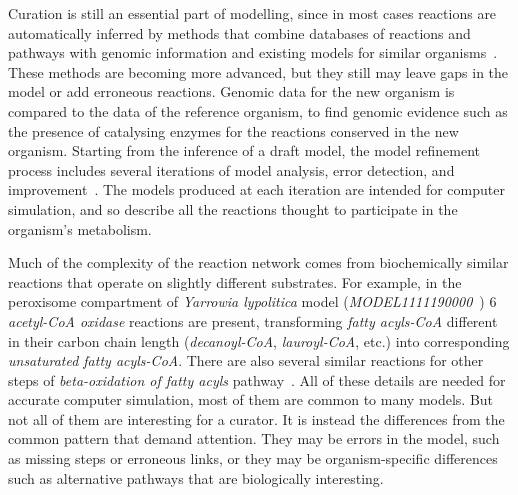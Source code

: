 \documentclass[9pt]{article}
\newcounter{rm}
\begin{document}
Curation is still an essential part of modelling, since in most cases reactions are automatically inferred by methods that combine databases of reactions and pathways with genomic information and existing models for similar organisms~\citep{Swainston2011}. These methods are becoming more advanced, but they still may leave gaps in the model or add erroneous reactions. Genomic data for the new organism is compared to the data of the reference organism, to find genomic evidence such as the presence of catalysing enzymes for the reactions conserved in the new organism. Starting from the inference of a draft model, the model refinement process includes several iterations of model analysis, error detection, and improvement~\citep{Thiele2010}. The models produced at each iteration are intended for computer simulation, and so describe all the reactions thought to participate in the organism's metabolism.

Much of the complexity of the reaction network comes from biochemically similar reactions that operate on slightly different substrates. For example, in the peroxisome compartment of \emph{Yarrowia lypolitica} model (\emph{MODEL1111190000}~\citep{Loira12}) 6 \emph{acetyl-CoA oxidase} reactions are present, transforming \emph{fatty acyls-CoA} different in their carbon chain length (\emph{decanoyl-CoA}, \emph{lauroyl-CoA}, etc.) into corresponding \emph{unsaturated fatty acyls-CoA}. There are also several similar reactions for other steps of \emph{beta-oxidation of fatty acyls} pathway~\citep{Metzler01}. 
All of these details are needed for accurate computer simulation, most of them are common to many models.
But not all of them are interesting for a curator. It is instead the differences from the common pattern that demand attention. They may be errors in the model, such as missing steps or erroneous links, or they may be organism-specific differences such as alternative pathways that are biologically interesting.


\end{document}
